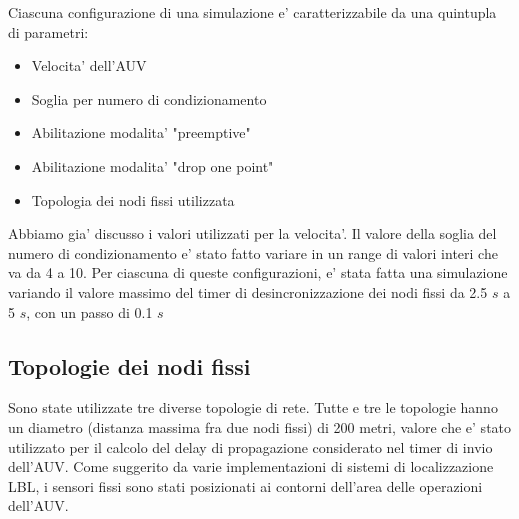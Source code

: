 \par
Ciascuna configurazione di una simulazione e' caratterizzabile da una quintupla di parametri:
\begin{itemize}
    \item Velocita' dell'AUV
    \item Soglia per numero di condizionamento
    \item Abilitazione modalita' "preemptive"
    \item Abilitazione modalita' "drop one point"
    \item Topologia dei nodi fissi utilizzata
\end{itemize}
Abbiamo gia' discusso i valori utilizzati per la velocita'. Il valore della soglia del numero di condizionamento e' stato fatto variare in un range di valori interi che va da 4 a 10. Per ciascuna di queste configurazioni, e' stata fatta una simulazione variando il valore massimo del timer di desincronizzazione dei nodi fissi da 2.5 $s$ a 5 $s$, con un passo di 0.1 $s$

\subsection{Topologie dei nodi fissi}
Sono state utilizzate tre diverse topologie di rete. Tutte e tre le topologie hanno un diametro (distanza massima fra due nodi fissi) di 200 metri, valore che e' stato utilizzato per il calcolo del delay di propagazione considerato nel timer di invio dell'AUV. Come suggerito da varie implementazioni di sistemi di localizzazione LBL, i sensori fissi sono stati posizionati ai contorni dell'area delle operazioni dell'AUV. \newline
